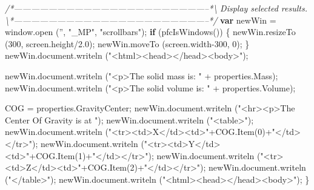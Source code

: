 \documentclass[]{article}
\newenvironment{Shaded}{}{}
\newcommand{\KeywordTok}[1]{\textcolor[rgb]{0.00,0.44,0.13}{\textbf{{#1}}}}
\newcommand{\DecValTok}[1]{\textcolor[rgb]{0.25,0.63,0.44}{{#1}}}
\newcommand{\FloatTok}[1]{\textcolor[rgb]{0.25,0.63,0.44}{{#1}}}
\newcommand{\StringTok}[1]{\textcolor[rgb]{0.25,0.44,0.63}{{#1}}}
\newcommand{\CommentTok}[1]{\textcolor[rgb]{0.38,0.63,0.69}{\textit{{#1}}}}
\newcommand{\OtherTok}[1]{\textcolor[rgb]{0.00,0.44,0.13}{{#1}}}
\newcommand{\FunctionTok}[1]{\textcolor[rgb]{0.02,0.16,0.49}{{#1}}}
\newcommand{\NormalTok}[1]{{#1}}
\begin{document}
\begin{Shaded}
\begin{Highlighting}[]
\CommentTok{/*--------------------------------------------------------------------*\textbackslash{} }
\CommentTok{  Display selected results.}
\CommentTok{\textbackslash{}*--------------------------------------------------------------------*/}  
  \KeywordTok{var} \NormalTok{newWin = }\OtherTok{window}\NormalTok{.}\FunctionTok{open} \NormalTok{(}\StringTok{''}\NormalTok{, }\StringTok{"_MP"}\NormalTok{, }\StringTok{"scrollbars"}\NormalTok{);}
  \KeywordTok{if} \NormalTok{(}\FunctionTok{pfcIsWindows}\NormalTok{())}
    \NormalTok{\{}
      \OtherTok{newWin}\NormalTok{.}\FunctionTok{resizeTo} \NormalTok{(}\DecValTok{300}\NormalTok{, }\OtherTok{screen}\NormalTok{.}\FunctionTok{height}\NormalTok{/}\FloatTok{2.0}\NormalTok{);}
      \OtherTok{newWin}\NormalTok{.}\FunctionTok{moveTo} \NormalTok{(}\OtherTok{screen}\NormalTok{.}\FunctionTok{width}\DecValTok{-300}\NormalTok{, }\DecValTok{0}\NormalTok{);}
    \NormalTok{\}}
  \OtherTok{newWin}\NormalTok{.}\OtherTok{document}\NormalTok{.}\FunctionTok{writeln} \NormalTok{(}\StringTok{"<html><head></head><body>"}\NormalTok{);}
  
  \OtherTok{newWin}\NormalTok{.}\OtherTok{document}\NormalTok{.}\FunctionTok{writeln} \NormalTok{(}\StringTok{"<p>The solid mass is: "} \NormalTok{+ }\OtherTok{properties}\NormalTok{.}\FunctionTok{Mass}\NormalTok{);}
  \OtherTok{newWin}\NormalTok{.}\OtherTok{document}\NormalTok{.}\FunctionTok{writeln} \NormalTok{(}\StringTok{"<p>The solid volume is: "} \NormalTok{+ }\OtherTok{properties}\NormalTok{.}\FunctionTok{Volume}\NormalTok{);}
  
  \NormalTok{COG = }\OtherTok{properties}\NormalTok{.}\FunctionTok{GravityCenter}\NormalTok{;}
  \OtherTok{newWin}\NormalTok{.}\OtherTok{document}\NormalTok{.}\FunctionTok{writeln} \NormalTok{(}\StringTok{"<hr><p>The Center Of Gravity is at "}\NormalTok{);}
  \OtherTok{newWin}\NormalTok{.}\OtherTok{document}\NormalTok{.}\FunctionTok{writeln} \NormalTok{(}\StringTok{"<table>"}\NormalTok{);}
  \OtherTok{newWin}\NormalTok{.}\OtherTok{document}\NormalTok{.}\FunctionTok{writeln} \NormalTok{(}\StringTok{"<tr><td>X</td><td>"}\NormalTok{+}\OtherTok{COG}\NormalTok{.}\FunctionTok{Item}\NormalTok{(}\DecValTok{0}\NormalTok{)+}\StringTok{"</td></tr>"}\NormalTok{);}
  \OtherTok{newWin}\NormalTok{.}\OtherTok{document}\NormalTok{.}\FunctionTok{writeln} \NormalTok{(}\StringTok{"<tr><td>Y</td><td>"}\NormalTok{+}\OtherTok{COG}\NormalTok{.}\FunctionTok{Item}\NormalTok{(}\DecValTok{1}\NormalTok{)+}\StringTok{"</td></tr>"}\NormalTok{);}
  \OtherTok{newWin}\NormalTok{.}\OtherTok{document}\NormalTok{.}\FunctionTok{writeln} \NormalTok{(}\StringTok{"<tr><td>Z</td><td>"}\NormalTok{+}\OtherTok{COG}\NormalTok{.}\FunctionTok{Item}\NormalTok{(}\DecValTok{2}\NormalTok{)+}\StringTok{"</td></tr>"}\NormalTok{);}
  \OtherTok{newWin}\NormalTok{.}\OtherTok{document}\NormalTok{.}\FunctionTok{writeln} \NormalTok{(}\StringTok{"</table>"}\NormalTok{); }
  \OtherTok{newWin}\NormalTok{.}\OtherTok{document}\NormalTok{.}\FunctionTok{writeln} \NormalTok{(}\StringTok{"<html><head></head><body>"}\NormalTok{);}
\NormalTok{\}}
\end{Highlighting}
\end{Shaded}
\end{document}

